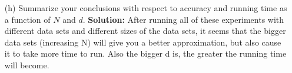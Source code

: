 \documentclass[a4paper]{article}
\begin{document}
\begin{itemize}
\begin{center}
    \end{center}
    \item[(h)] Summarize your conclusions with respect to accuracy and running time as a 
    function of $N$ and $d$.
    \textbf{Solution:} After running all of these experiments with different data sets and 
    different sizes of the data sets, it seems that the bigger data sets (increasing N) will 
    give you a better approximation, but also cause it to take more time to run.  Also the 
    bigger d is, the greater the running time will become.
\end{itemize}
\end{document}
